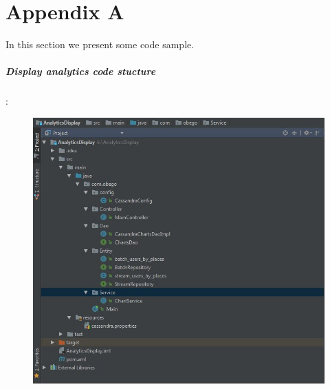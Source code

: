 %
%

\chapter{Appendix A}
\label{app:app01}

In this section we present some code sample.

\paragraph{Display analytics code stucture} :
\begin{figure}[h!]
	\centering
	\includegraphics[height=0.4\textheight]{DiplayanalyticsCodeStucture}
	\label{fig:FilialesEtClients}
\end{figure}
\newpage
